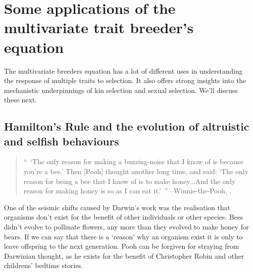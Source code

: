 \section{Some applications of the multivariate trait breeder's equation}

The multivariate breeders equation has a lot of different uses in
understanding the response of multiple traits to selection. It also
offers strong insights into the mechanistic underpinnings of kin selection and sexual selection. We'll discuss these next.

\subsection{Hamilton's Rule and the evolution of altruistic and
  selfish behaviours}
\begin{quotation}
``~`The only reason for making a buzzing-noise that I know of is
because you're a bee.' Then [Pooh] thought another long time, and
said: `The only reason for being a bee that I know of is to make
honey...And the only reason for making honey is so as I can eat it.'~''
--Winnie-the-Pooh, \citet{milne}.  
\end{quotation}




One of the seismic shifts caused by Darwin's work was the realisation that organisms don't exist for the benefit of other
individuals or other species. 
Bees didn't evolve to pollinate flowers, any more than they 
evolved to make honey for bears. If we can say that there
is a `reason' why an organism exist it is only to leave offspring to the
next generation.  Pooh can be forgiven for straying from Darwinian thought, as he exists
for the benefit of Christopher Robin and other childrens' bedtime
stories. 

